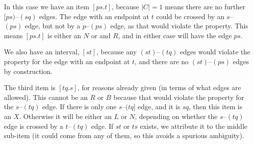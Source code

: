 \begin{center}
\end{center}

In this case we have an item $[ps.t]$, because $|C| = 1$ means there are no further $[ps)$--$(sq)$ edges.
The edge with an endpoint at $t$ could be crossed by an $s$--$(ps)$ edge, but not by a $p$--$(ps)$ edge, as that would violate the \oneEC property.
This means $[ps.t]$ is either an $N$ or and $R$, and in either case will have the edge $ps$.

We also have an interval, $[st]$, because any $(st)$--$(tq)$ edges would violate the \oneEC property for the edge with an endpoint at $t$, and there are no $(st)$--$(ps)$ edges by construction.

The third item is $[tq.s]$, for reasons already given (in terms of what edges are allowed).
This cannot be an $R$ or $B$ because that would violate the \oneEC property for the $s$--$(tq)$ edge.
If there is only one $s$--$(tq]$ edge, and it is $sq$, then this item is an $X$.
Otherwise it will be either an $L$ or $N$, depending on whether the $s$--$(tq)$ edge is crossed by a $t$--$(tq)$ edge.
If $st$ or $ts$ exists, we attribute it to the middle sub-item (it could come from any of them, so this avoids a spurious ambiguity).


\begin{center}
\end{center}

